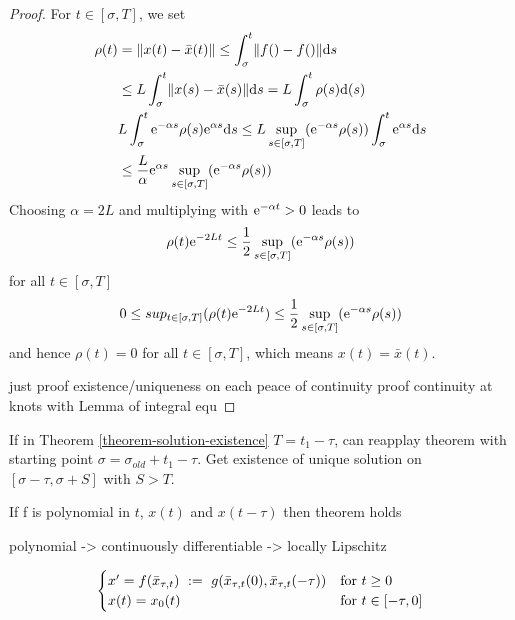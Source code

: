 \begin{proof}
    For $t\in [\sigma,T]$, we set
    \begin{align*}
        \rho(t) &= \lVert x(t)-\bar{x}(t)\rVert \leq \int_\sigma^t \lVert f()-f()\rVert\text{d}s\\
        & \leq L \int_\sigma^t \lVert x(s)-\bar{x}(s)\rVert\text{d}s = L \int_\sigma^t \rho(s)\text{d}(s)\\
        & L \int_\sigma^t \text{e}^{-\alpha s}\rho(s)\text{e}^{\alpha s}\text{d}s \leq L \sup_{s\in [\sigma,T]}(\text{e}^{-\alpha s}\rho(s))\int_\sigma^t \text{e}^{\alpha s}\text{d}s\\
        & \leq\frac{L}{\alpha}\text{e}^{\alpha s} \sup_{s\in [\sigma,T]}(\text{e}^{-\alpha s}\rho(s))
    \end{align*}
    Choosing $\alpha=2L$ and multiplying with $\text{e}^{-\alpha t}>0$ leads to
    \begin{equation}
        \rho(t)\text{e}^{-2Lt} \leq \frac{1}{2}\sup_{s\in [\sigma,T]}(\text{e}^{-\alpha s}\rho(s))
    \end{equation}
    for all $t\in [\sigma,T]$
    \begin{equation}
        0 \leq sup_{t\in [\sigma,T]}(\rho(t)\text{e}^{-2Lt}) \leq \frac{1}{2}\sup_{s\in [\sigma,T]}(\text{e}^{-\alpha s}\rho(s))
    \end{equation}
    and hence $\rho(t)=0$ for all $t\in [\sigma,T]$, which means $x(t)=\bar{x}(t)$.

    just proof existence/uniqueness on each peace of continuity proof continuity at knots with Lemma of integral equ

\end{proof}

\begin{corollary}
    \label{cor:continuability-of-solution}
    If in Theorem \ref{theorem-solution-existence} $T=t_1-\tau$, can reapplay theorem with starting point $\sigma=\sigma_{old}+t_1-\tau$. Get existence of unique solution on $[\sigma-\tau,\sigma+S]$ with $S>T$.
\end{corollary}

\begin{corollary}
    \label{corollary}
    If f is polynomial in $t$, $x(t)$ and $x(t-\tau)$ then theorem holds

    polynomial -> continuously differentiable -> locally Lipschitz


\begin{equation}
    \begin{cases}
        x'=f(\bar{x}_{\tau,t})~\mathrel{\mathop{:}}=~ g(\bar{x}_{\tau,t}(0),\bar{x}_{\tau,t}(-\tau)) &\text{for } t\geq 0\\
        x(t)=x_0(t) & \text{for } t\in[-\tau,0]
    \end{cases}
\end{equation}
\end{corollary}

